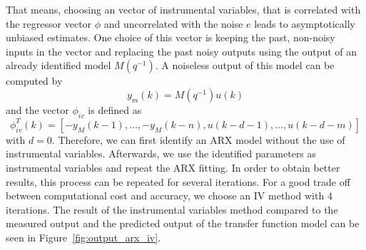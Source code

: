 \documentclass{scrartcl}
\begin{document}
That means, choosing an vector of instrumental variables, that is correlated with the regressor vector $\phi$ and uncorrelated with the noise $e$ leads to asymptotically unbiased estimates.
One choice of this vector is keeping the past, non-noisy inputs in the vector and replacing the past noisy outputs using the output of an already identified model $M(q^{-1})$. A noiseless output of this model can be computed by 
\begin{equation}
y_m(k) = M(q^{-1}) u(k)
\end{equation}
and the vector $\phi_{iv}$ is defined as
\begin{equation}
\phi_{iv}^T(k) = \left[-y_M(k-1),\ldots,-y_M(k-n),u(k-d-1),\ldots,u(k-d-m)\right]
\end{equation}
with $d=0$. 
Therefore, we can first identify an ARX model without the use of instrumental variables. Afterwards, we use the identified parameters as instrumental variables and repeat the ARX fitting.
In order to obtain better results, this process can be repeated for several iterations. For a good trade off between computational cost and accuracy, we choose an IV method with $4$ iterations. The result of the instrumental variables method compared to the measured output and the predicted output of the transfer function model can be seen in Figure~\ref{fig:output_arx_iv}. 

\end{document}
